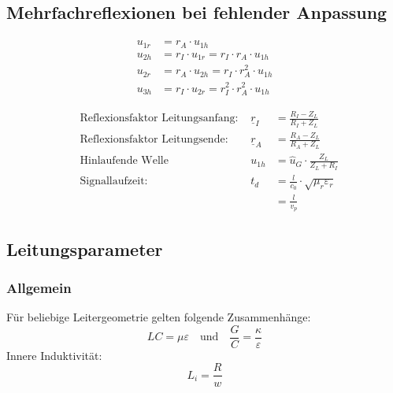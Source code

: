 \subsection{Mehrfachreflexionen bei fehlender Anpassung}

\begin{align*}
    u_{1r} & = r_A\cdot u_{1h}                                \\
    u_{2h} & = r_I\cdot u_{1r} = r_I\cdot r_A\cdot u_{1h}     \\
    u_{2r} & = r_A\cdot u_{2h} = r_I\cdot r_A^2\cdot u_{1h}   \\
    u_{3h} & = r_I\cdot u_{2r} = r_I^2\cdot r_A^2\cdot u_{1h}
\end{align*}

\begin{align*}
     & \text{Reflexionsfaktor Leitungsanfang: } & \underline{r}_I & = \frac{R_I - Z_L}{R_I + Z_L}                 \\
     & \text{Reflexionsfaktor Leitungsende: }   & \underline{r}_A & = \frac{R_A - Z_L}{R_A + Z_L}                 \\
     & \text{Hinlaufende Welle}                 & u_{1h}          & = \hat{u}_G \cdot\frac{Z_L}{Z_L+R_I}          \\
     & \text{Signallaufzeit: }                  & t_d             & = \frac{l}{c_0}\cdot\sqrt{\mu_r\varepsilon_r} \\
     &                                          &                 & = \frac{l}{v_p}
\end{align*}
\subsection{Leitungsparameter}
				\subsubsection{Allgemein}
Für beliebige Leitergeometrie gelten folgende Zusammenhänge:
\[
\boxed{LC = \mu\varepsilon} \quad \text{und} \quad \boxed{\frac{G}{C} = \frac{\kappa}{\varepsilon}}
\]
Innere Induktivität:
\[
L_i = \frac{R}{w}
\]
\textbf{\color{red}{Leitungen gehen HIN und ZURÜCK!!!}\\
	\color{red}{Länge verdoppeln!!!}
}
